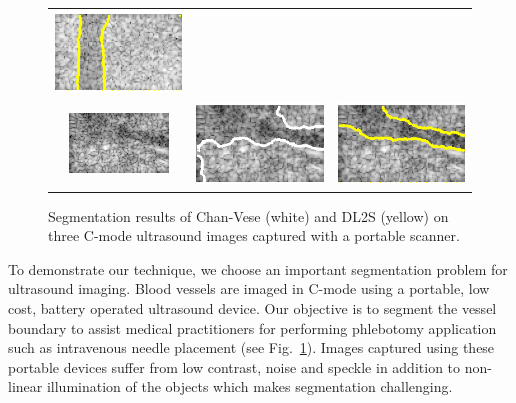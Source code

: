 \begin{figure}[t]
\begin{tabular}{@{}ccc@{}}
		\includegraphics[width=.3\linewidth]{./images/DL2S/compare/imCyl2_DL}
		\\ 
		\includegraphics[width=.3\linewidth]{./images/DL2S/compare/vessFIRvol15_orig}&
 		\includegraphics[width=.3\linewidth]{./images/DL2S/compare/vessFIRvol15_CV} &
		\includegraphics[width=.3\linewidth]{./images/DL2S/compare/vessFIRvol15_DL} 
	\end{tabular}
\caption[Chan-Vese vs DL2S]{Segmentation results of Chan-Vese\cite{chan_vese} (white) and DL2S (yellow) on three C-mode ultrasound images captured with a portable scanner.}
\label{fig:viz_comp}
\end{figure}
To demonstrate our technique, we choose an important segmentation problem for ultrasound imaging. Blood vessels are imaged in C-mode using a portable, low cost, battery operated ultrasound device. Our objective is to segment the vessel boundary to assist medical practitioners for performing phlebotomy application such as intravenous needle placement (see Fig.~\ref{fig:viz_comp}). Images captured using these portable devices suffer from low contrast, noise and speckle in addition to non-linear illumination of the objects which makes segmentation challenging. 
